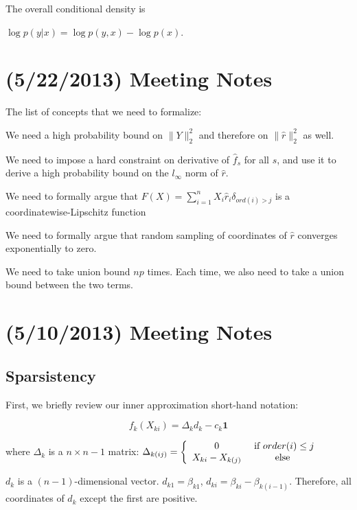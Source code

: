 \documentclass{article}
\begin{document}
The overall conditional density is

$\log p(y|x) = \log p(y,x) - \log p(x)$. 



\section{(5/22/2013) Meeting Notes}

The list of concepts that we need to formalize:
\begin{packed_enum}
\item We need a high probability bound on $\|Y\|_2^2$ and therefore on $\| \hat{r} \|_2^2$ as well.
\item We need to impose a hard constraint on derivative of $\hat{f}_s$ for all $s$, and use it to derive a high probability bound on the $l_\infty$ norm of $\hat{r}$.
\item We need to formally argue that $F(X) = \sum_{i=1}^n X_i \hat{r}_i \delta_{ ord(i) > j}$ is a coordinatewise-Lipschitz function
\item We need to formally argue that random sampling of coordinates of $\hat{r}$ converges exponentially to zero.
\item We need to take union bound $np$ times. Each time, we also need to take a union bound between the two terms.
\end{packed_enum}


\section{(5/10/2013) Meeting Notes}

\subsection{Sparsistency}

First, we briefly review our inner approximation short-hand notation:

\[f_k(X_{ki}) = \Delta_k d_k  - c_k \mathbf{1}\]

where $\Delta_k$ is a $n\times n-1$ matrix: $\Delta_{k (ij)} = \left\{ \begin{array}{cc} 0 & \textrm{ if } order(i) \leq j \\ X_{ki} - X_{k(j)} & \textrm{ else } \end{array} \right.$

$d_k$ is a $(n-1)$-dimensional vector. $d_{k1} = \beta_{k1}$, $d_{ki} = \beta_{ki} - \beta_{k (i-1)}$. Therefore, all coordinates of $d_k$ except the first are positive. 
\end{document}
